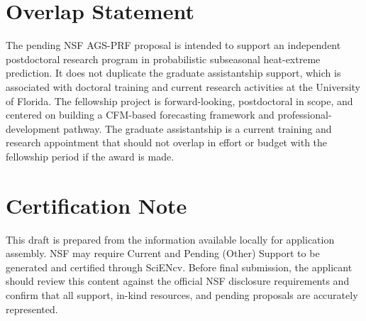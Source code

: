 \documentclass[11pt,letterpaper]{article}
\begin{document}
\section*{Overlap Statement}
The pending NSF AGS-PRF proposal is intended to support an independent postdoctoral research program in probabilistic subseasonal heat-extreme prediction. It does not duplicate the graduate assistantship support, which is associated with doctoral training and current research activities at the University of Florida. The fellowship project is forward-looking, postdoctoral in scope, and centered on building a CFM-based forecasting framework and professional-development pathway. The graduate assistantship is a current training and research appointment that should not overlap in effort or budget with the fellowship period if the award is made.

\section*{Certification Note}
This draft is prepared from the information available locally for application assembly. NSF may require Current and Pending (Other) Support to be generated and certified through SciENcv. Before final submission, the applicant should review this content against the official NSF disclosure requirements and confirm that all support, in-kind resources, and pending proposals are accurately represented.
\end{document}
